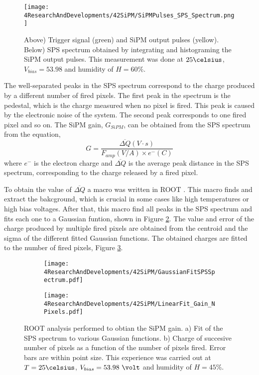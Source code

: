\begin{figure}[hbtp]
\centering
\texttt{[image: 4ResearchAndDevelopments/42SiPM/SiPMPulses\_SPS\_Spectrum.png]}
\caption{Above) Trigger signal (green) and SiPM output pulses (yellow). Below) SPS spectrum obtained by integrating and histograming the SiPM output pulses. This measurement was done at $25\celsius$, $V_{bias}=53.98$ and humidity of $H=60\%$. \label{fig:OutputPulses_SPSspectrum}}
\end{figure}

The well-separated peaks in the SPS spectrum correspond to the charge produced by a different number of fired pixels. The first peak in the spectrum is the pedestal, which is the charge measured when no pixel is fired. This peak is caused by the electronic noise of the system. The second peak corresponds to one fired pixel and so on. The SiPM gain, $G_{SiPM}$, can be obtained from the SPS spectrum from the equation,
\begin{equation}
G=\frac{\overline{\Delta Q}(V \cdot{} s)}{F_{amp}(V/A) \times e^-(C)}
\label{SiPMGain}
\end{equation}
where $e^-$ is the electron charge and $\overline{\Delta Q}$ is the average peak distance in the SPS spectrum, corresponding to the charge released by a fired pixel. 

To obtain the value of $\overline{\Delta Q}$ a macro was written in ROOT \cite{ROOTWebPage}. This macro finds and extract the bakcground, which is crucial in some cases like high temperatures or high bias voltages. After that, this macro find all peaks in the SPS spectrum and fits each one to a Gaussian funtion, shown in Figure \ref{subfig:GaussianFitSiPMs}. The value and error of the charge produced by multiple fired pixels are obtained from the centroid and the sigma of the different fitted Gaussian functions. The obtained charges are fitted to the number of fired pixels, Figure \ref{subfig:LinearFitSiPMGain}.

\begin{figure}
\centering
    \begin{subfigure}[b]{0.47\textwidth}
    \centering
    \texttt{[image: 4ResearchAndDevelopments/42SiPM/GaussianFitSPSSpectrum.pdf]}  
    \caption{\label{subfig:GaussianFitSiPMs}}
    \end{subfigure}
    \hfill
    \begin{subfigure}[b]{0.47\textwidth}
    \centering
    \texttt{[image: 4ResearchAndDevelopments/42SiPM/LinearFit\_Gain\_NPixels.pdf]}  
    \caption{\label{subfig:LinearFitSiPMGain}}
    \end{subfigure}
 \caption{ROOT analysis performed to obtian the SiPM gain. a) Fit of the SPS spectrum to various Gaussian functions. b) Charge of succesive number of pixels as a function of the number of pixels fired. Error bars are within point size. This experience was carried out at $T=25\celsius$, $V_{bias}=53.98~\volt$ and humidity of $H=45\%$.}
 \label{fig:ROOTAnalysisSiPMGain}
\end{figure}


